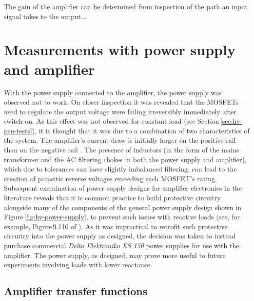 
The gain of the amplifier can be determined from inspection of the path an input signal takes to the output... 

\section{\label{sec:hv-psu-amp-measurements}Measurements with power supply and amplifier}

With the power supply connected to the amplifier, the power supply was observed not to work. On closer inspection it was revealed that the \glspl{MOSFET} used to regulate the output voltage were failing irreversibly immediately after switch-on. As this effect was not observed for constant load (see Section\,\ref{sec:hv-psu-tests}), it is thought that it was due to a combination of two characteristics of the system. The amplifier's current draw is initially larger on the positive rail than on the negative rail . The presence of inductors (in the form of the mains transformer and the \gls{AC} filtering chokes in both the power supply and amplifier), which due to tolerances can have slightly imbalanced filtering, can lead to the creation of parasitic reverse voltages exceeding each \gls{MOSFET}'s rating. Subsequent examination of power supply designs for amplifier electronics in the literature reveals that it is common practice to build protective circuitry alongside many of the components of the general power supply design shown in Figure\,\ref{fig:hv-power-supply}, to prevent such issues with reactive loads (see, for example, Figure\,9.110 of \cite{Horowitz2015}). As it was impractical to retrofit such protective circuitry into the power supply as designed, the decision was taken to instead purchase commercial \emph{Delta Elektronika ES 150} power supplies for use with the amplifier. The power supply, as designed, may prove more useful to future experiments involving loads with lower reactance.

\subsection{Amplifier transfer functions}

